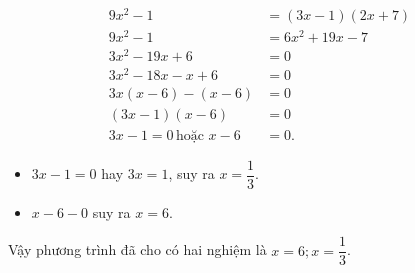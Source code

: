 \begin{bt}
{\begin{enumerate}
\begin{align*}
	9x^2-1&=\left(3x-1\right)\left(2x+7\right)\\
	9x^2-1&=6x^2+19x-7 \\
	3x^2-19x+6&=0\\
	3x^2-18x-x+6&=0\\
	3x(x-6)-(x-6)&=0\\
	(3x-1)(x-6)&=0\\
	3x-1=0\,\text{hoặc }x-6&=0.
	\end{align*}
	\begin{itemize}
	\item $3x-1=0$ hay $3x=1$, suy ra $x=\dfrac{1}{3}$.
	\item $x-6-0$ suy ra $x=6$.
	\end{itemize}
	Vậy phương trình đã cho có hai nghiệm là $x=6; x=\dfrac{1}{3}$.
	\end{enumerate}
	}
\end{bt}
